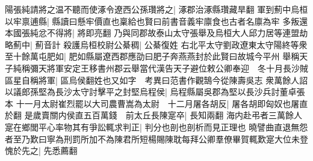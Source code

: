 陽張純請將之温不聽而使涿令遼西公孫瓚將之|{
	涿郡治涿縣瓚藏旱翻}
軍到薊中烏桓以牢禀逋縣|{
	縣讀曰懸牢價直也稟給也賢曰前書音義牢廪食也古者名廪為牢}
多叛還本國張純忿不得將|{
	將即亮翻}
乃與同郡故泰山太守張舉及烏桓大人邱力居等連盟劫略薊中|{
	薊音計}
殺護烏桓校尉公綦稠|{
	公綦復姓}
右北平太守劉政遼東太守陽終等衆至十餘萬屯肥如|{
	肥如縣屬遼西郡應劭曰肥子奔燕燕封於此賢曰故城今平州}
舉稱天子純稱彌天將軍安定王移書州郡云舉當代漢告天子避位敕公卿奉迎　冬十月長沙賊區星自稱將軍|{
	區烏侯翻姓也又如字　考異曰范書作觀鵠今從陳壽吳志}
衆萬餘人詔以議郎孫堅為長沙太守討擊平之封堅烏程侯|{
	烏程縣屬吳郡為堅以長沙兵討董卓張本}
十一月太尉崔烈罷以大司農曹嵩為太尉　十二月屠各胡反|{
	屠各胡即匈奴也屠直於翻}
是歲賣關内侯直五百萬錢　前太丘長陳寔卒|{
	長知兩翻}
海内赴弔者三萬餘人寔在鄉閭平心率物其有爭訟輒求判正|{
	判分也剖也剖析而見正理也}
曉譬曲直退無怨者至乃歎曰寧為刑罰所加不為陳君所短楊賜陳耽每拜公卿羣僚畢賀輒歎寔大位未登愧於先之|{
	先悉薦翻}


